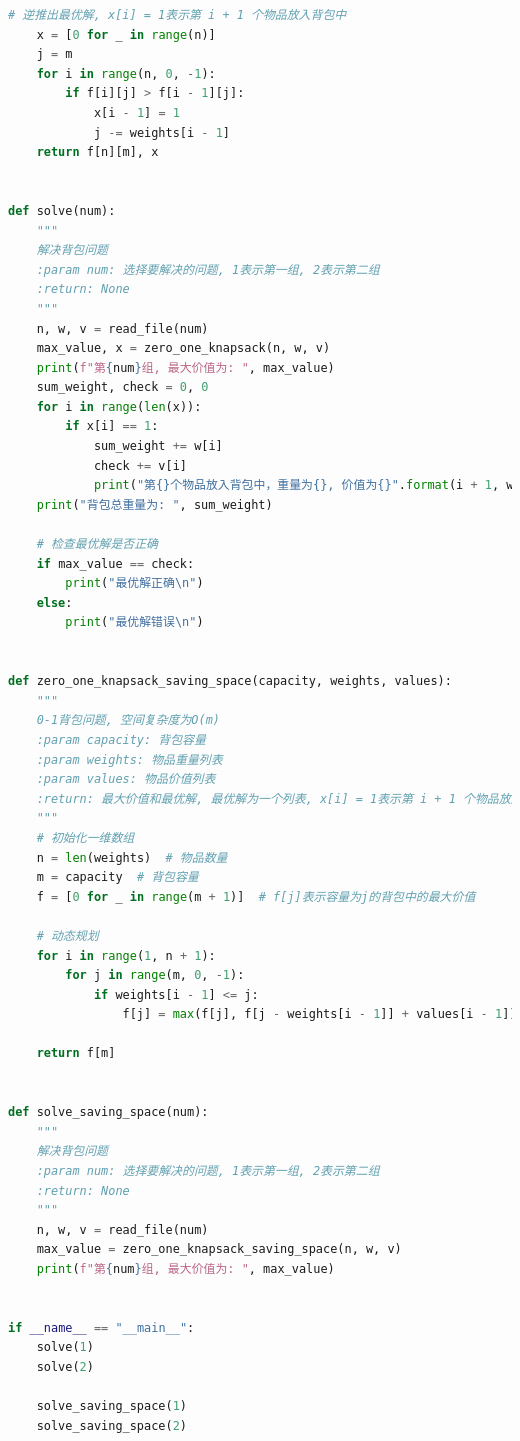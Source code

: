 \documentclass[lang=cn,11pt,a4paper]{elegantpaper}
\begin{document}
\begin{lstlisting}[language=python]
    # 逆推出最优解, x[i] = 1表示第 i + 1 个物品放入背包中
    x = [0 for _ in range(n)]
    j = m
    for i in range(n, 0, -1):
        if f[i][j] > f[i - 1][j]:
            x[i - 1] = 1
            j -= weights[i - 1]
    return f[n][m], x


def solve(num):
    """
    解决背包问题
    :param num: 选择要解决的问题, 1表示第一组, 2表示第二组
    :return: None
    """
    n, w, v = read_file(num)
    max_value, x = zero_one_knapsack(n, w, v)
    print(f"第{num}组, 最大价值为: ", max_value)
    sum_weight, check = 0, 0
    for i in range(len(x)):
        if x[i] == 1:
            sum_weight += w[i]
            check += v[i]
            print("第{}个物品放入背包中，重量为{}, 价值为{}".format(i + 1, w[i], v[i]))
    print("背包总重量为: ", sum_weight)

    # 检查最优解是否正确
    if max_value == check:
        print("最优解正确\n")
    else:
        print("最优解错误\n")


def zero_one_knapsack_saving_space(capacity, weights, values):
    """
    0-1背包问题, 空间复杂度为O(m)
    :param capacity: 背包容量
    :param weights: 物品重量列表
    :param values: 物品价值列表
    :return: 最大价值和最优解, 最优解为一个列表, x[i] = 1表示第 i + 1 个物品放入背包中
    """
    # 初始化一维数组
    n = len(weights)  # 物品数量
    m = capacity  # 背包容量
    f = [0 for _ in range(m + 1)]  # f[j]表示容量为j的背包中的最大价值

    # 动态规划
    for i in range(1, n + 1):
        for j in range(m, 0, -1):
            if weights[i - 1] <= j:
                f[j] = max(f[j], f[j - weights[i - 1]] + values[i - 1])

    return f[m]


def solve_saving_space(num):
    """
    解决背包问题
    :param num: 选择要解决的问题, 1表示第一组, 2表示第二组
    :return: None
    """
    n, w, v = read_file(num)
    max_value = zero_one_knapsack_saving_space(n, w, v)
    print(f"第{num}组, 最大价值为: ", max_value)


if __name__ == "__main__":
    solve(1)
    solve(2)

    solve_saving_space(1)
    solve_saving_space(2)

\end{lstlisting}

\end{document}
